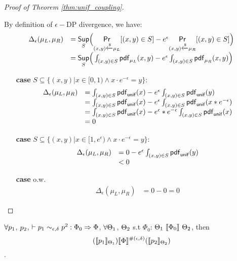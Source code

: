 \documentclass[a4paper,11pt]{article}
\begin{document}
\begin{proof}[Proof of Theorem \ref{thm:unif_coupling}]
\begin{itemize}
	By definition of $\epsilon-$DP divergence, we have:
	 \[
	 \begin{array}{ll}
	 \Delta_{\epsilon}(\mu_L, \mu_R) 
	 & = \underset{S}{\mathsf{Sup}}
	 \Big(
	 \underset{(x,y) \xleftarrow{\$} \mu_L}{\mathsf{Pr}}[(x,y) \in S] - e^{\epsilon} \underset{(x,y) \xleftarrow{\$} \mu_R}{\mathsf{Pr}}[(x,y) \in S]
	 \Big) \\
	 & =\underset{S}{\mathsf{Sup}}
	 \Big(
	 \int_{(x,y) \in S} \mathsf{pdf}_{\mu_L}(x, y) - e^{\epsilon} \int_{(x,y) \in S} \mathsf{pdf}_{\mu_R}(x, y)
	 \Big)	 
	 \end{array}
	 \]
	 \begin{itemize}
	 	\item[{\bf case}] $S \subseteq \{(x, y) | x \in [0, 1) \land x \cdot e^{-\epsilon} = y\}$:\\
		 \[
		 \begin{array}{ll}
		 \Delta_{\epsilon}(\mu_L, \mu_R) 
		 & = 
		 \int_{(x,y) \in S} \mathsf{pdf}_{\mathsf{unif}}(x) - e^{\epsilon} \int_{(x,y) \in S} \mathsf{pdf}_{\mathsf{unif}}(y)\\
		 & = 
		 \int_{(x,y) \in S} \mathsf{pdf}_{\mathsf{unif}}(x) - e^{\epsilon} \int_{(x,y) \in S} \mathsf{pdf}_{\mathsf{unif}}(x * e^{-\epsilon})\\ 
		 & = 
		 \int_{(x,y) \in S} \mathsf{pdf}_{\mathsf{unif}}(x) - e^{\epsilon}* e^{-\epsilon} \int_{(x,y) \in S} \mathsf{pdf}_{\mathsf{unif}}(x )\\
		 & = 0 
		 \end{array}
		 \]
	 	\item[{\bf case}] $S \subseteq \{(x, y) | x \in [1, e^{\epsilon}) \land x \cdot e^{-\epsilon} = y\}$:\\
		 \[
		 \begin{array}{ll}
		 \Delta_{\epsilon}(\mu_L, \mu_R) 
		 & = 
		 0 - e^{\epsilon} \int_{(x,y) \in S} \mathsf{pdf}_{\mathsf{unif}}(y)\\
		 & <  0 
		 \end{array}
		 \]
	 	\item[{\bf case}] o.w.\\
		 \[
		 \begin{array}{ll}
		 \Delta_{\epsilon}(\mu_L, \mu_R) 
		 & = 0 - 0 =  0 
		 \end{array}
		 \]	 	

	 \end{itemize}

\end{itemize}
\end{proof}
%
%
%
%
%
%
\clearpage
\begin{thm}[Soundness]
 $\forall p_1$, $p_2$,  $ \vdash p_1	
\sim_{\epsilon, \delta} 
p^2 :
\Phi_0 \Rightarrow \Phi $,    $\forall \Theta_1$, $\Theta_2$ 
s.t $\Phi_0$: 
$\Theta_1 ~ \llbracket \Phi_0 \rrbracket ~ \Theta_2$,
then
$$ 
(\llbracket p_1 \rrbracket_{\Theta_1})  
\llbracket \Phi \rrbracket^{\#(\epsilon, \delta)} 
(\llbracket p_2 \rrbracket_{\Theta_2}) 
$$.
\end{thm}
\end{document}
